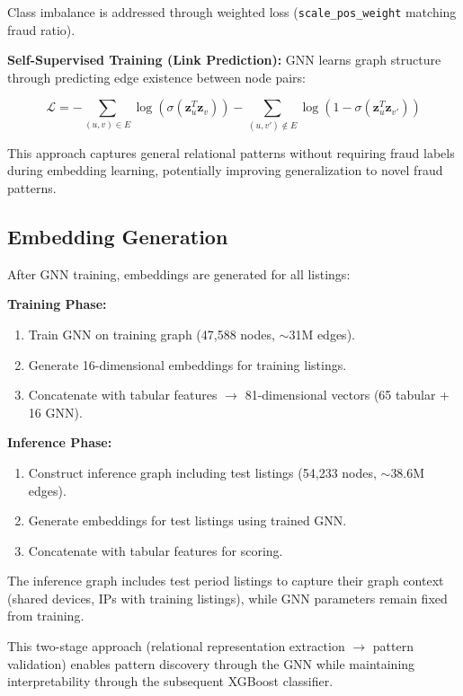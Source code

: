 Class imbalance is addressed through weighted loss (\texttt{scale\_pos\_weight} matching fraud ratio).

\textbf{Self-Supervised Training (Link Prediction):} GNN learns graph structure through predicting edge existence between node pairs:

\begin{equation}
\mathcal{L} = -\sum_{(u,v) \in E} \log(\sigma(\mathbf{z}_u^T \mathbf{z}_v)) - \sum_{(u,v') \notin E} \log(1 - \sigma(\mathbf{z}_u^T \mathbf{z}_{v'}))
\end{equation}

This approach captures general relational patterns without requiring fraud labels during embedding learning, potentially improving generalization to novel fraud patterns.

\subsection{Embedding Generation}

After GNN training, embeddings are generated for all listings:

\textbf{Training Phase:}
\begin{enumerate}
    \item Train GNN on training graph (47,588 nodes, $\sim$31M edges).
    \item Generate 16-dimensional embeddings for training listings.
    \item Concatenate with tabular features $\rightarrow$ 81-dimensional vectors (65 tabular + 16 GNN).
\end{enumerate}

\textbf{Inference Phase:}
\begin{enumerate}
    \item Construct inference graph including test listings (54,233 nodes, $\sim$38.6M edges).
    \item Generate embeddings for test listings using trained GNN.
    \item Concatenate with tabular features for scoring.
\end{enumerate}

The inference graph includes test period listings to capture their graph context (shared devices, IPs with training listings), while GNN parameters remain fixed from training.

This two-stage approach (relational representation extraction $\rightarrow$ pattern validation) enables pattern discovery through the GNN while maintaining interpretability through the subsequent XGBoost classifier.
